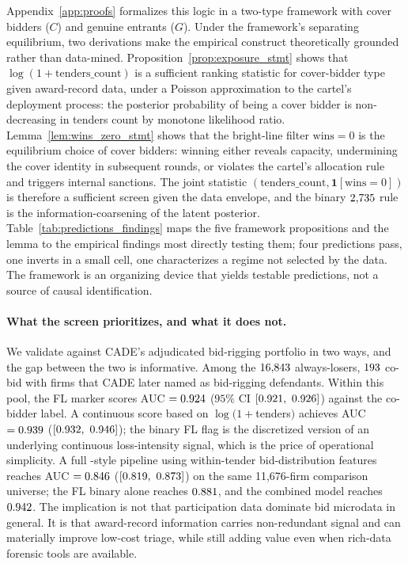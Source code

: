 Appendix~\ref{app:proofs} formalizes this logic in a
two-type framework with cover bidders ($C$) and genuine
entrants ($G$). Under the framework's separating equilibrium,
two derivations make the empirical construct theoretically
grounded rather than data-mined.
Proposition~\ref{prop:exposure_stmt} shows that
$\log(1+\text{tenders\_count})$ is a sufficient ranking
statistic for cover-bidder type given award-record data, under
a Poisson approximation to the cartel's deployment process:
the posterior probability of being a cover bidder is
non-decreasing in tenders count by monotone likelihood ratio.
Lemma~\ref{lem:wins_zero_stmt} shows that the bright-line
filter $\text{wins}=0$ is the equilibrium choice of cover
bidders: winning either reveals capacity, undermining the
cover identity in subsequent rounds, or violates the cartel's
allocation rule and triggers internal sanctions. The joint
statistic $(\text{tenders\_count}, \mathbf{1}[\text{wins}=0])$
is therefore a sufficient screen given the data envelope, and
the binary $2{,}735$ rule is the information-coarsening of the
latent posterior. Table~\ref{tab:predictions_findings} maps
the five framework propositions and the lemma to the empirical
findings most directly testing them; four predictions pass,
one inverts in a small cell, one characterizes a regime not
selected by the data. The framework is an organizing device
that yields testable predictions, not a source of causal
identification.

\paragraph{What the screen prioritizes, and what it does not.}
We validate against CADE's adjudicated bid-rigging portfolio
in two ways, and the gap between the two is informative.
Among the $16{,}843$ always-losers, $193$ co-bid with firms
that CADE later named as bid-rigging defendants. Within this
pool, the FL marker scores AUC $=0.924$ ($95\%$ CI $[0.921,\ 0.926]$)
against the co-bidder label. A continuous score
based on $\log(1 + $tenders$)$ achieves AUC $=0.939$
($[0.932,\ 0.946]$); the binary FL flag is the discretized
version of an underlying continuous loss-intensity signal,
which is the price of operational simplicity. A full
\citet{imhof2019detecting}-style pipeline using within-tender
bid-distribution features reaches AUC $=0.846$
($[0.819,\ 0.873]$) on the same 11{,}676-firm comparison
universe; the FL binary alone reaches $0.881$, and the
combined model reaches $0.942$. The implication is
not that participation data dominate bid microdata in general.
It is that award-record information carries non-redundant
signal and can materially improve low-cost triage, while still
adding value even when rich-data forensic tools are available.

